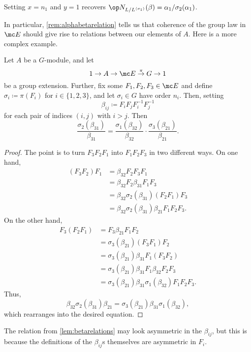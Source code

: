 \documentclass{article}
\numberwithin{equation}{section}
\begin{document}
\begin{remark} \label{rem:alphabetarelation}
	Setting $x=n_1$ and $y=1$ recovers $\op N_{L/L^{\langle\sigma_1\rangle}}(\beta)=\alpha_1/\sigma_2(\alpha_1)$.
\end{remark}
In particular, \autoref{rem:alphabetarelation} tells us that coherence of the group law in $\mc E$ should give rise to relations between our elements of $A$. Here is a more complex example.
\begin{lemma} \label{lem:betarelations}
	Let $A$ be a $ G$-module, and let 
	\[1\to A\to\mc E\stackrel\pi\to G\to1\]
	be a group extension. Further, fix some $F_1,F_2,F_3\in\mc E$ and define $\sigma_i\coloneqq\pi(F_i)$ for $i\in\{1,2,3\}$, and let $\sigma_i\in G$ have order $n_i$. Then, setting
	\[\beta_{ij}\coloneqq F_iF_jF_i^{-1}F_j^{-1}\]
	for each pair of indices $(i,j)$ with $i>j$. Then
	\[\frac{\sigma_2(\beta_{31})}{\beta_{31}}=\frac{\sigma_1(\beta_{32})}{\beta_{32}}\cdot\frac{\sigma_3(\beta_{21})}{\beta_{21}}.\]
\end{lemma}
\begin{proof}
	The point is to turn $F_3F_2F_1$ into $F_1F_2F_3$ in two different ways. On one hand,
	\begin{align*}
		(F_3F_2)F_1 &= \beta_{32}F_2F_3F_1 \\
		&= \beta_{32}F_2\beta_{31}F_1F_3 \\
		&= \beta_{32}\sigma_2(\beta_{31})(F_2F_1)F_3 \\
		&= \beta_{32}\sigma_2(\beta_{31})\beta_{21}F_1F_2F_3.
	\end{align*}
	On the other hand,
	\begin{align*}
		F_3(F_2F_1) &= F_3\beta_{21}F_1F_2 \\
		&= \sigma_3(\beta_{21})(F_3F_1)F_2 \\
		&= \sigma_3(\beta_{21})\beta_{31}F_1(F_3F_2) \\
		&= \sigma_3(\beta_{21})\beta_{31}F_1\beta_{32}F_2F_3 \\
		&= \sigma_3(\beta_{21})\beta_{31}\sigma_1(\beta_{32})F_1F_2F_3.
	\end{align*}
	Thus,
	\[\beta_{32}\sigma_2(\beta_{31})\beta_{21}=\sigma_3(\beta_{21})\beta_{31}\sigma_1(\beta_{32}),\]
	which rearranges into the desired equation.
\end{proof}
\begin{remark}
	The relation from \autoref{lem:betarelations} may look asymmetric in the $\beta_{ij}$, but this is because the definitions of the $\beta_{ij}$s themselves are asymmetric in $F_i$.
\end{remark}
\end{document}
